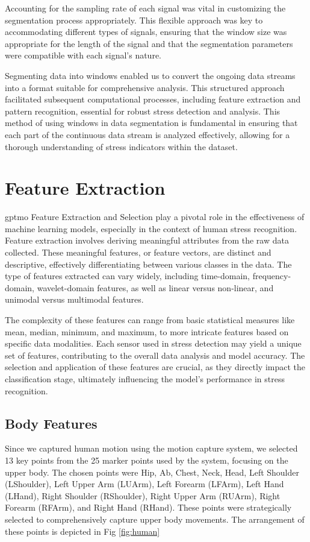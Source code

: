 Accounting for the sampling rate of each signal was vital in customizing the segmentation process appropriately. This flexible approach was key to accommodating different types of signals, ensuring that the window size was appropriate for the length of the signal and that the segmentation parameters were compatible with each signal's nature.

Segmenting data into windows enabled us to convert the ongoing data streams into a format suitable for comprehensive analysis. This structured approach facilitated subsequent computational processes, including feature extraction and pattern recognition, essential for robust stress detection and analysis. This method of using windows in data segmentation is fundamental in ensuring that each part of the continuous data stream is analyzed effectively, allowing for a thorough understanding of stress indicators within the dataset.

\section{Feature Extraction} \gls*{gptmo}
Feature Extraction and Selection play a pivotal role in the effectiveness of machine learning models, especially in the context of human stress recognition. Feature extraction involves deriving meaningful attributes from the raw data collected. These meaningful features, or feature vectors, are distinct and descriptive, effectively differentiating between various classes in the data. The type of features extracted can vary widely, including time-domain, frequency-domain, wavelet-domain features, as well as linear versus non-linear, and unimodal versus multimodal features.

The complexity of these features can range from basic statistical measures like mean, median, minimum, and maximum, to more intricate features based on specific data modalities. Each sensor used in stress detection may yield a unique set of features, contributing to the overall data analysis and model accuracy. The selection and application of these features are crucial, as they directly impact the classification stage, ultimately influencing the model's performance in stress recognition.
\subsection{Body Features}
Since we captured human motion using the motion capture system, we selected 13 key points from the 25 marker points used by the system, focusing on the upper body. The chosen points were Hip, Ab, Chest, Neck, Head, Left Shoulder (LShoulder), Left Upper Arm (LUArm), Left Forearm (LFArm), Left Hand (LHand), Right Shoulder (RShoulder), Right Upper Arm (RUArm), Right Forearm (RFArm), and Right Hand (RHand). These points were strategically selected to comprehensively capture upper body movements. The arrangement of these points is depicted in Fig \ref{fig:human}

